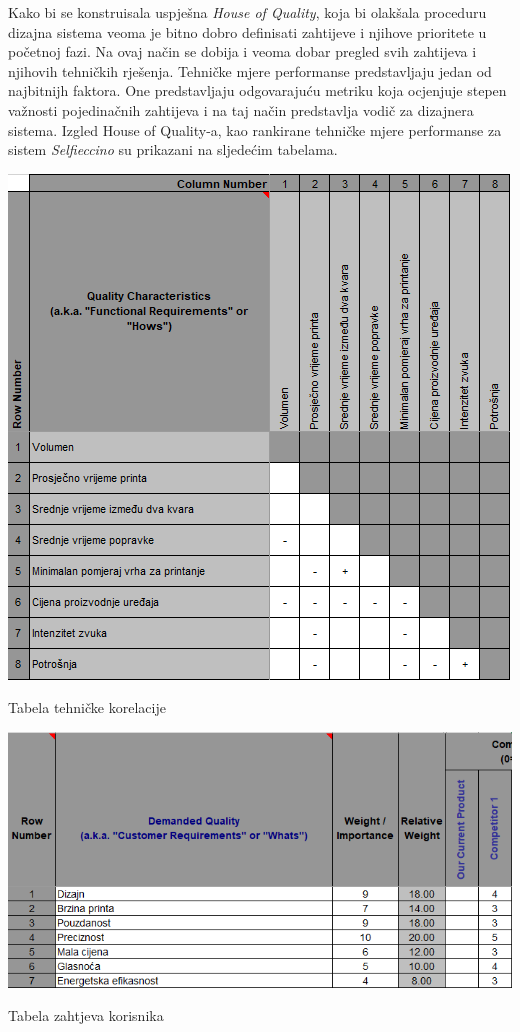 \documentclass[12pt]{article}
\begin{document}
Kako bi se konstruisala uspje\v{s}na \textit{House of Quality}, koja bi olak\v{s}ala proceduru dizajna sistema veoma je bitno dobro definisati zahtijeve i njihove prioritete u po\v{c}etnoj fazi. Na ovaj na\v{c}in se dobija i veoma dobar pregled svih zahtijeva i njihovih tehni\v{c}kih rje\v{s}enja. Tehni\v{c}ke mjere performanse predstavljaju jedan od najbitnijh faktora. One predstavljaju odgovaraju\'cu metriku koja ocjenjuje stepen va\v{z}nosti pojedina\v{c}nih zahtijeva i na taj na\v{c}in predstavlja vodi\v{c} za dizajnera sistema. Izgled House of Quality-a, kao rankirane tehni\v{c}ke mjere performanse za sistem \textit{Selfieccino} su prikazani na sljede\'cim tabelama.
\begin{table}
\includegraphics[scale=1]{tabela_gornja}
\caption{Tabela tehničke korelacije}
\end{table}


\begin{table}
\includegraphics[width=\textwidth]{tabela_zahtjevi_korisnika}
\caption{Tabela zahtjeva korisnika}
\end{table}
\end{document}
